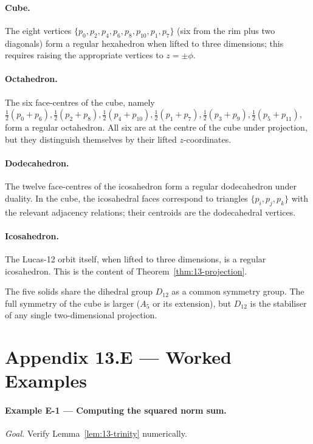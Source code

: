 \paragraph{Cube.}
The eight vertices $\{p_{0}, p_{2}, p_{4}, p_{6}, p_{8}, p_{10}, p_{1},
p_{7}\}$ (six from the rim plus two diagonals) form a regular
hexahedron when lifted to three dimensions; this requires raising
the appropriate vertices to $z = \pm \phi$.

\paragraph{Octahedron.}
The six face-centres of the cube, namely
$\frac{1}{2}(p_{0} + p_{6}), \frac{1}{2}(p_{2} + p_{8}),
\frac{1}{2}(p_{4} + p_{10}), \frac{1}{2}(p_{1} + p_{7}),
\frac{1}{2}(p_{3} + p_{9}), \frac{1}{2}(p_{5} + p_{11})$, form a
regular octahedron. All six are at the centre of the cube under
projection, but they distinguish themselves by their lifted
$z$-coordinates.

\paragraph{Dodecahedron.}
The twelve face-centres of the icosahedron form a regular
dodecahedron under duality. In the cube, the icosahedral faces
correspond to triangles $\{p_{i}, p_{j}, p_{k}\}$ with the relevant
adjacency relations; their centroids are the dodecahedral vertices.

\paragraph{Icosahedron.}
The Lucas-12 orbit itself, when lifted to three dimensions, is a
regular icosahedron. This is the content of
Theorem~\ref{thm:13-projection}.

The five solids share the dihedral group $D_{12}$ as a common
symmetry group. The full symmetry of the cube is larger ($A_{5}$
or its extension), but $D_{12}$ is the stabiliser of any single
two-dimensional projection.

\section*{Appendix 13.E --- Worked Examples}
\label{sec:13-appE}

\paragraph{Example E-1 --- Computing the squared norm sum.}
\emph{Goal.} Verify Lemma~\ref{lem:13-trinity} numerically.

